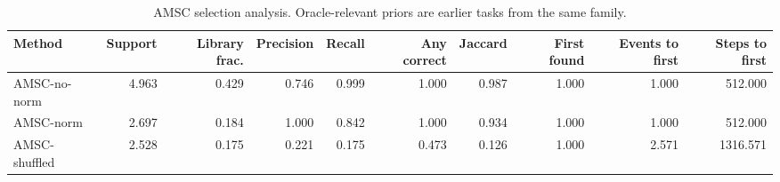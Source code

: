 \begin{table}[ht]
    \caption{AMSC selection analysis. Oracle-relevant priors are earlier tasks from the same family.}
    \label{tbl:amsc_selection}
    \centering
    \scriptsize
    \begin{tabular}{lrrrrrrrrr}
    \toprule
Method & Support & Library frac. & Precision & Recall & Any correct & Jaccard & First found & Events to first & Steps to first \\
    \midrule
AMSC-no-norm & 4.963 & 0.429 & 0.746 & 0.999 & 1.000 & 0.987 & 1.000 & 1.000 & 512.000 \\
AMSC-norm & 2.697 & 0.184 & 1.000 & 0.842 & 1.000 & 0.934 & 1.000 & 1.000 & 512.000 \\
AMSC-shuffled & 2.528 & 0.175 & 0.221 & 0.175 & 0.473 & 0.126 & 1.000 & 2.571 & 1316.571 \\
    \bottomrule
    \end{tabular}
\end{table}
